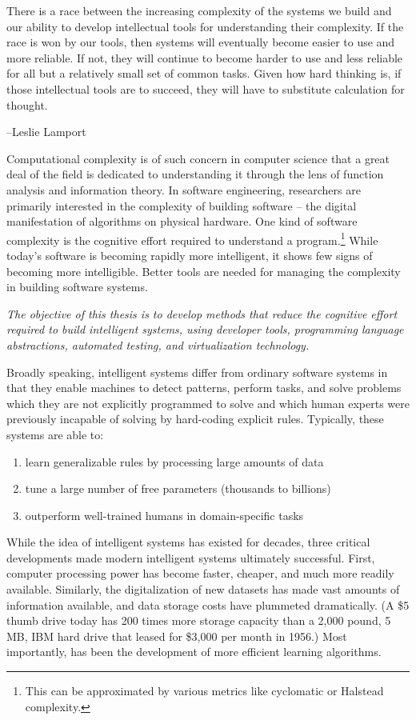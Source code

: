 \documentclass[12pt,initial,twoside,maitrise]{dms}
\numberwithin{equation}{section}
\numberwithin{table}{chapter}
\numberwithin{figure}{chapter}
\begin{document}
\setlength{\epigraphwidth}{0.85\textwidth}
\epigraph{There is a race between the increasing complexity of the systems we build and our ability to develop intellectual tools for understanding their complexity. If the race is won by our tools, then systems will eventually become easier to use and more reliable. If not, they will continue to become harder to use and less reliable for all but a relatively small set of common tasks. Given how hard thinking is, if those intellectual tools are to succeed, they will have to substitute calculation for thought.}{\begin{flushright}--Leslie Lamport\end{flushright}}

Computational complexity is of such concern in computer science that a great deal of the field is dedicated to understanding it through the lens of function analysis and information theory. In software engineering, researchers are primarily interested in the complexity of building software -- the digital manifestation of algorithms on physical hardware. One kind of software complexity is the cognitive effort required to understand a program.\footnote{This can be approximated by various metrics like cyclomatic or Halstead complexity.} While today's software is becoming rapidly more intelligent, it shows few signs of becoming more intelligible. Better tools are needed for managing the complexity in building software systems.

\textit{The objective of this thesis is to develop methods that reduce the cognitive effort required to build intelligent systems, using developer tools, programming language abstractions, automated testing, and virtualization technology.}

Broadly speaking, intelligent systems differ from ordinary software systems in that they enable machines to detect patterns, perform tasks, and solve problems which they are not explicitly programmed to solve and which human experts were previously incapable of solving by hard-coding explicit rules. Typically, these systems are able to:\\
%
\begin{enumerate}
    \item learn generalizable rules by processing large amounts of data
    \item tune a large number of free parameters (thousands to billions)
    \item outperform well-trained humans in domain-specific tasks
\end{enumerate}
%
While the idea of intelligent systems has existed for decades, three critical developments made modern intelligent systems ultimately successful. First, computer processing power has become faster, cheaper, and much more readily available. Similarly, the digitalization of new datasets has made vast amounts of information available, and data storage costs have plummeted dramatically. (A \$5 thumb drive today has 200 times more storage capacity than a 2,000 pound, 5 MB, IBM hard drive that leased for \$3,000 per month in 1956.) Most importantly, has been the development of more efficient learning algorithms.
\end{document}
